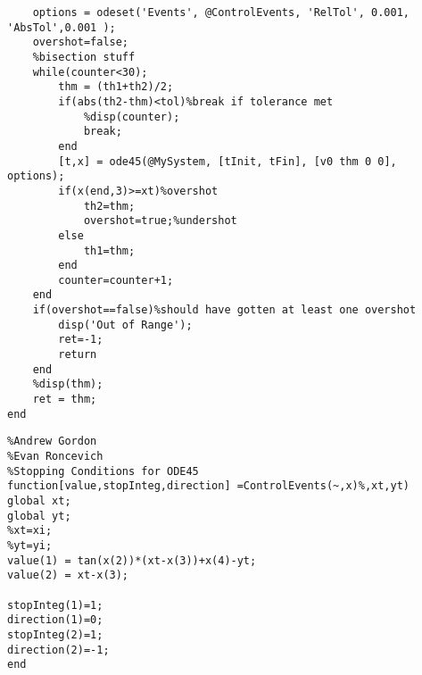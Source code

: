 \documentclass[12pt]{article}
\begin{document}
\begin{enumerate}
\begin{verbatim}
    options = odeset('Events', @ControlEvents, 'RelTol', 0.001, 'AbsTol',0.001 );
    overshot=false;
    %bisection stuff
    while(counter<30);
        thm = (th1+th2)/2;
        if(abs(th2-thm)<tol)%break if tolerance met
            %disp(counter);
            break;
        end
        [t,x] = ode45(@MySystem, [tInit, tFin], [v0 thm 0 0], options);
        if(x(end,3)>=xt)%overshot
            th2=thm;
            overshot=true;%undershot
        else
            th1=thm;
        end
        counter=counter+1;
    end
    if(overshot==false)%should have gotten at least one overshot
        disp('Out of Range');
        ret=-1;
        return
    end
    %disp(thm);
    ret = thm;
end
\end{verbatim}
\hrulefill
\begin{verbatim}
%Andrew Gordon
%Evan Roncevich
%Stopping Conditions for ODE45
function[value,stopInteg,direction] =ControlEvents(~,x)%,xt,yt)
global xt;
global yt;
%xt=xi;
%yt=yi;
value(1) = tan(x(2))*(xt-x(3))+x(4)-yt;
value(2) = xt-x(3);

stopInteg(1)=1;
direction(1)=0;
stopInteg(2)=1;
direction(2)=-1;
end
\end{verbatim}
\hrulefill

\end{enumerate} 
\end{document}
